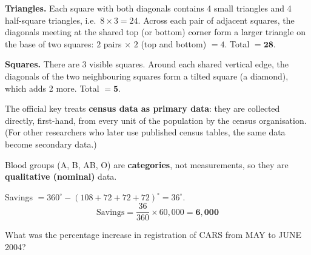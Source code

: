 \textbf{Triangles.} Each square with both diagonals contains 4 small triangles and 4 half-square triangles, i.e.\ $8\times3=24$. Across each pair of adjacent squares, the diagonals meeting at the shared top (or bottom) corner form a larger triangle on the base of two squares: $2$ pairs $\times$ $2$ (top and bottom) $=4$. Total $=\mathbf{28}$.

\textbf{Squares.} There are 3 visible squares. Around each shared vertical edge, the diagonals of the two neighbouring squares form a tilted square (a diamond), which adds 2 more. Total $=\mathbf{5}$.

The official key treats \textbf{census data as primary data}: they are collected directly, first-hand, from every unit of the population by the census organisation. (For other researchers who later use published census tables, the same data become secondary data.)

Blood groups (A, B, AB, O) are \textbf{categories}, not measurements, so they are \textbf{qualitative (nominal)} data.


Savings $=360^\circ-(108+72+72+72)^\circ=36^\circ$.
\[\text{Savings}=\frac{36}{360}\times60{,}000=\mathbf{6{,}000}\]


What was the percentage increase in registration of CARS from MAY to JUNE 2004?


